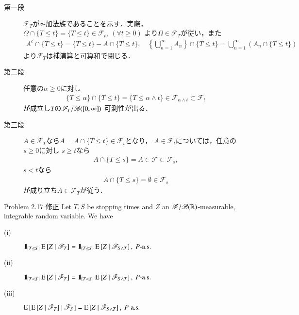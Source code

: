 	\begin{prf}\mbox{}
		\begin{description}
			\item[第一段]
				$\mathscr{F}_T$が$\sigma$-加法族であることを示す．実際，
				$\Omega \cap \{T \leq t\} = \{T \leq t\} \in \mathscr{F}_t,\ (\forall t \geq 0)$
				より$\Omega \in \mathscr{F}_T$が従い，また
				\begin{align}
					A^c \cap \{T \leq t\} = \{T \leq t\} - A \cap \{T \leq t\},
					\quad \left\{ \bigcup_{n=1}^\infty A_n \right\} \cap \{T \leq t\}
					= \bigcup_{n=1}^\infty \left( A_n \cap \{T \leq t\} \right)
				\end{align}
				より$\mathscr{F}_T$は補演算と可算和で閉じる．
				
			\item[第二段]
				任意の$\alpha \geq 0$に対し
				\begin{align}
					\{T \leq \alpha \} \cap \{T \leq t\}
					= \{T \leq \alpha \wedge t\}
					\in \mathscr{F}_{\alpha \wedge t} \subset \mathscr{F}_t
				\end{align}
				が成立し$T$の$\mathscr{F}_T/\mathscr{B}([0,\infty])$-可測性が出る．
				
			\item[第三段]
				$A \in \mathscr{F}_T$なら$A = A \cap \{T \leq t\} \in \mathscr{F}_t$となり，
				$A \in \mathscr{F}_t$については，任意の$s \geq 0$に対し
				$s \geq t$なら
				\begin{align}
					A \cap \{T \leq s\} = A \in \mathscr{F} \subset \mathscr{F}_s,
				\end{align}
				$s < t$なら
				\begin{align}
					A \cap \{T \leq s\} = \emptyset \in \mathscr{F}_s
				\end{align}
				が成り立ち$A \in \mathscr{F}_T$が従う．
				\QED
		\end{description}
	\end{prf}
	
	\begin{itembox}[l]{Problem 2.17 修正}
		Let $T,S$ be stopping times and $Z$ an $\mathscr{F}/\mathscr{B}(\mathbb{R})$-measurable, 
		integrable random variable. We have
		\begin{description}
			\item[(i)] $\mbox{1}\hspace{-0.25em}\mbox{l}_{\{T \leq S\}} \operatorname{E} \left[ Z \ \middle|\ \mathscr{F}_T \right] = \mbox{1}\hspace{-0.25em}\mbox{l}_{\{T \leq S\}} \operatorname{E} \left[ Z \ \middle|\ \mathscr{F}_{S \wedge T} \right],\ \mbox{$P$-a.s.}$
			\item[(ii)] $\mbox{1}\hspace{-0.25em}\mbox{l}_{\{T < S\}} \operatorname{E} \left[ Z \ \middle|\ \mathscr{F}_T \right] = \mbox{1}\hspace{-0.25em}\mbox{l}_{\{T < S\}} \operatorname{E} \left[ Z \ \middle|\ \mathscr{F}_{S \wedge T} \right],\ \mbox{$P$-a.s.}$
			\item[(iii)] $\operatorname{E} \left[ \operatorname{E} \left[ Z \ \middle|\ \mathscr{F}_T \right] \ \middle|\ \mathscr{F}_S \right] = \operatorname{E} \left[ Z \ \middle|\ \mathscr{F}_{S \wedge T} \right],\ \mbox{$P$-a.s.}$
		\end{description}
	\end{itembox}
	
